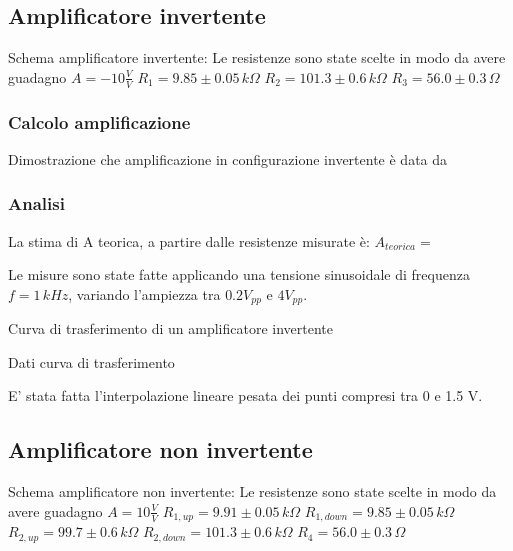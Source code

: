 \subsection{Amplificatore invertente}
Schema amplificatore invertente:
Le resistenze sono state scelte in modo da avere guadagno $A=-10 \frac{V}{V}$
$R_1=9.85 \pm 0.05\,k\Omega $%
$R_2=101.3 \pm 0.6\,k\Omega$ %
$R_3=56.0 \pm 0.3\,\Omega$ %

\subsubsection{Calcolo amplificazione}
Dimostrazione che amplificazione in configurazione invertente è data da %

\subsubsection{Analisi}
La stima di A teorica, a partire dalle resistenze misurate è:
$A_{teorica}=$ %

Le misure sono state fatte applicando una tensione sinusoidale di frequenza $ f=1 \,kHz$, variando l'ampiezza tra 
$0.2 V_{pp}$ e $4 V_{pp}$.

\begin{grafico} 
 \centering 
  
 \caption{Curva di trasferimento di un amplificatore invertente} 
 \label{gr:amp_inv.tex} 
\end{grafico}

\begin{tabella}
 \centering
  
 \caption{Dati curva di trasferimento}
 \label{tab:tab_inv.tex}
\end{tabella}

E' stata fatta l'interpolazione lineare pesata dei punti compresi tra 0 e 1.5 V.




\subsection{Amplificatore non invertente}

Schema amplificatore non invertente:
Le resistenze sono state scelte in modo da avere guadagno $A=10 \frac{V}{V}$
$R_{1,up}=9.91 \pm0.05 \,k\Omega $%
$R_{1,down}=9.85 \pm 0.05\,k\Omega$ %
$R_{2,up}=99.7 \pm 0.6\,k\Omega$ %
$R_{2,down}=101.3 \pm 0.6\,k\Omega$
$R_4=56.0 \pm 0.3\,\Omega$

